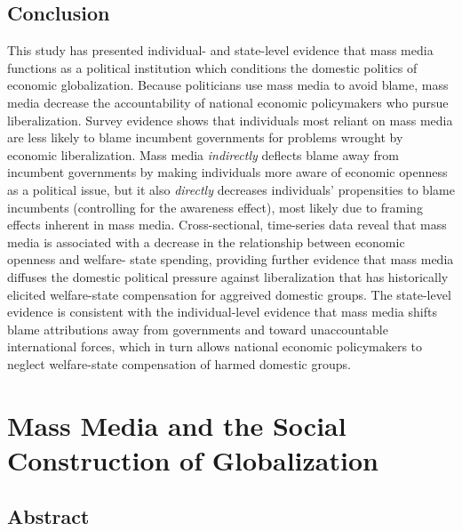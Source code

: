 \documentclass[12pt]{report}
\begin{document}
\section{Conclusion}

This study has presented individual- and state-level evidence that mass media functions as a
political institution which conditions the domestic politics of economic globalization. Because
politicians use mass media to avoid blame, mass media decrease the accountability of national
economic policymakers who pursue liberalization. Survey evidence shows that individuals most reliant
on mass media are less likely to blame incumbent governments for problems wrought by economic
liberalization. Mass media \emph{indirectly} deflects blame away from incumbent governments by
making individuals more aware of economic openness as a political issue, but it also \emph{directly}
decreases individuals' propensities to blame incumbents (controlling for the awareness effect), most
likely due to framing effects inherent in mass media. Cross-sectional, time-series data reveal that
mass media is associated with a decrease in the relationship between economic openness and welfare-
state spending, providing further evidence that mass media diffuses the domestic political pressure
against liberalization that has historically elicited welfare-state compensation for aggreived
domestic groups. The state-level evidence is consistent with the individual-level evidence that mass
media shifts blame attributions away from governments and toward unaccountable international forces,
which in turn allows national economic policymakers to neglect welfare-state compensation of harmed
domestic groups.


\chapter{Mass Media and the Social Construction of Globalization}

\section{Abstract}
\end{document}
